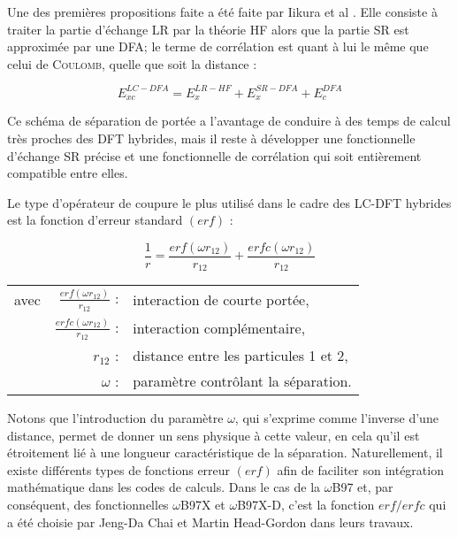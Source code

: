 	Une des premières propositions faite a été faite par Iikura et al \cite{iikura2001long}. Elle consiste à traiter la partie d'échange LR par la théorie HF alors que la partie SR est approximée par une DFA; le terme de corrélation est quant à lui le même que celui de \textsc{Coulomb}, quelle que soit la distance :
	
	\begin{equation}
	E_{xc}^{LC-DFA} = E_{x}^{LR-HF} + E_{x}^{SR-DFA} + E_{c}^{DFA}
	\end{equation}
	
	Ce schéma de séparation de portée a l'avantage de conduire à des temps de calcul très proches des DFT hybrides, mais il reste à développer une fonctionnelle d'échange SR précise et une fonctionnelle de corrélation qui soit entièrement compatible entre elles.
	
	Le type d'opérateur de coupure le plus utilisé dans le cadre des LC-DFT hybrides est la fonction d'erreur standard $(erf)$ :
	
	\begin{equation}
	\frac{1}{r} = \frac{erf(\omega r_{12})}{r_{12}} + \frac{erfc(\omega r_{12})}{r_{12}}
	\label{erf}
	\end{equation}
	
	\begin{flushleft}
		\begin{tabular}{@{}lrp{10cm}}
			avec & $\frac{erf(\omega r_{12})}{r_{12}}$ : & interaction de courte portée, \\
			& $\frac{erfc(\omega r_{12})}{r_{12}}$ : & interaction complémentaire, \\
			& $r_{12}$ : & distance entre les particules 1 et 2, \\
			& $\omega$ : & paramètre contrôlant la séparation.
		\end{tabular}
	\end{flushleft}
	
	Notons que l'introduction du paramètre $\omega$, qui s'exprime comme l'inverse d'une distance, permet de donner un sens physique à cette valeur, en cela qu'il est étroitement lié à une longueur caractéristique de la séparation.
	Naturellement, il existe différents types de fonctions erreur $(erf)$ afin de faciliter son intégration mathématique dans les codes de calculs. Dans le cas de la $\omega$B97 \cite{chai2008long} et, par conséquent, des fonctionnelles $\omega$B97X et $\omega$B97X-D, c'est la fonction $erf/erfc$ qui a été choisie par Jeng-Da Chai et Martin Head-Gordon dans leurs travaux. \\
	
